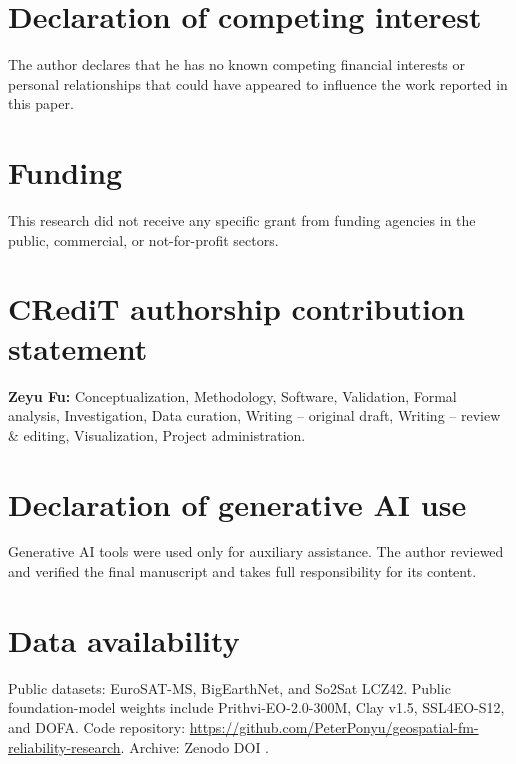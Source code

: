 \documentclass[preprint,11pt,authoryear]{elsarticle}
\begin{document}
\section*{Declaration of competing interest}
The author declares that he has no known competing financial interests or personal relationships
that could have appeared to influence the work reported in this paper.

\section*{Funding}
This research did not receive any specific grant from funding agencies in the public, commercial,
or not-for-profit sectors.

\section*{CRediT authorship contribution statement}
\textbf{Zeyu Fu:} Conceptualization, Methodology, Software, Validation, Formal analysis,
Investigation, Data curation, Writing -- original draft, Writing -- review \& editing,
Visualization, Project administration.

\section*{Declaration of generative AI use}
Generative AI tools were used only for auxiliary assistance. The author reviewed and verified the
final manuscript and takes full responsibility for its content.

\section*{Data availability}
Public datasets: EuroSAT-MS, BigEarthNet, and So2Sat LCZ42. Public foundation-model weights
include Prithvi-EO-2.0-300M, Clay v1.5, SSL4EO-S12, and DOFA.
Code repository:
\url{https://github.com/PeterPonyu/geospatial-fm-reliability-research}.
Archive: Zenodo DOI .

\FloatBarrier


\end{document}
